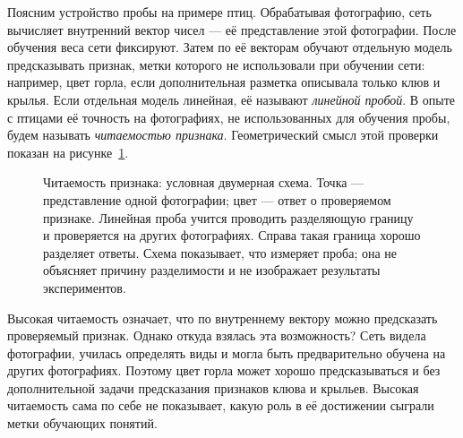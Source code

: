 \documentclass[10pt]{article}
\begin{document}
Поясним устройство пробы на примере птиц. Обрабатывая фотографию, сеть вычисляет внутренний вектор чисел --- её представление этой фотографии. После обучения веса сети фиксируют. Затем по её векторам обучают отдельную модель предсказывать признак, метки которого не использовали при обучении сети: например, цвет горла, если дополнительная разметка описывала только клюв и крылья. Если отдельная модель линейная, её называют \emph{линейной пробой}. В опыте с птицами её точность на фотографиях, не использованных для обучения пробы, будем называть \emph{читаемостью признака}. Геометрический смысл этой проверки показан на рисунке~\ref{fig:readability}.

\begin{figure}[htbp]
\centering
{}
\caption{Читаемость признака: условная двумерная схема. Точка --- представление одной фотографии; цвет --- ответ о проверяемом признаке. Линейная проба учится проводить разделяющую границу и проверяется на других фотографиях. Справа такая граница хорошо разделяет ответы. Схема показывает, что измеряет проба; она не объясняет причину разделимости и не изображает результаты экспериментов.}
\label{fig:readability}
\end{figure}

Высокая читаемость означает, что по внутреннему вектору можно предсказать проверяемый признак. Однако откуда взялась эта возможность? Сеть видела фотографии, училась определять виды и могла быть предварительно обучена на других фотографиях. Поэтому цвет горла может хорошо предсказываться и без дополнительной задачи предсказания признаков клюва и крыльев. Высокая читаемость сама по себе не показывает, какую роль в её достижении сыграли метки обучающих понятий.
\end{document}
